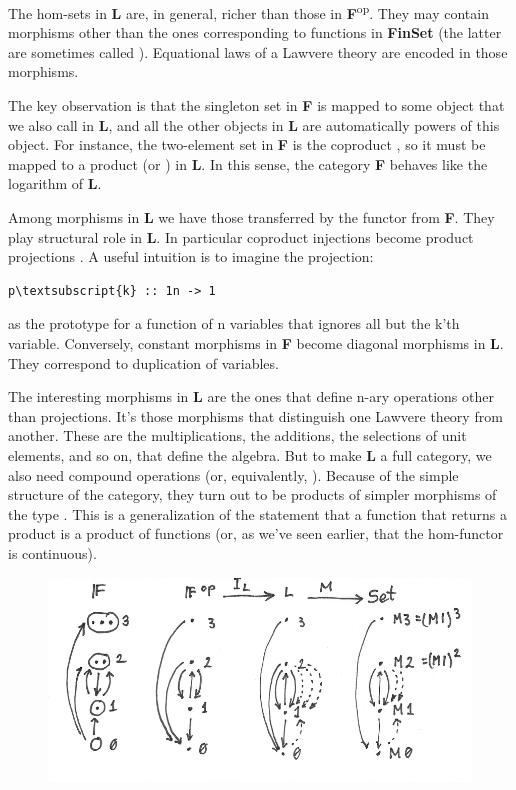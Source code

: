The hom-sets in \textbf{L} are, in general, richer than those in
\textbf{F}\textsuperscript{op}. They may contain morphisms other than
the ones corresponding to functions in \textbf{FinSet} (the latter are
sometimes called ). Equational laws of a
Lawvere theory are encoded in those morphisms.

The key observation is that the singleton set  in \textbf{F}
is mapped to some object that we also call  in \textbf{L}, and
all the other objects in \textbf{L} are automatically powers of this
object. For instance, the two-element set  in \textbf{F} is
the coproduct , so it must be mapped to a product
 (or ) in \textbf{L}. In this sense, the category
\textbf{F} behaves like the logarithm of \textbf{L}.

Among morphisms in \textbf{L} we have those transferred by the functor
 from \textbf{F}. They play structural role in \textbf{L}. In
particular coproduct injections  become product projections
. A useful intuition is to imagine the projection:

\begin{Verbatim}[commandchars=\\\{\}]
p\textsubscript{k} :: 1n -> 1
\end{Verbatim}
as the prototype for a function of n variables that ignores all but the
k'th variable. Conversely, constant morphisms 
in \textbf{F} become diagonal morphisms  in
\textbf{L}. They correspond to duplication of variables.

The interesting morphisms in \textbf{L} are the ones that define n-ary
operations other than projections. It's those morphisms that distinguish
one Lawvere theory from another. These are the multiplications, the
additions, the selections of unit elements, and so on, that define the
algebra. But to make \textbf{L} a full category, we also need compound
operations  (or, equivalently,
). Because of the simple structure of
the category, they turn out to be products of simpler morphisms of the
type . This is a generalization of the
statement that a function that returns a product is a product of
functions (or, as we've seen earlier, that the hom-functor is
continuous).

\begin{figure}[H]
\centering
\includegraphics[width=\textwidth]{images/lawvere1.png}
\end{figure}

